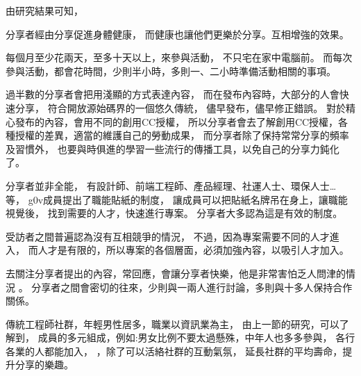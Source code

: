 
由研究結果可知，


分享者經由分享促進身體健康，
而健康也讓他們更樂於分享。互相增強的效果。

每個月至少花兩天，至多十天以上，來參與活動，
不只宅在家中電腦前。
而每次參與活動，都會花時間，少則半小時，多則一、二小時準備活動相關的事項。

過半數的分享者會把用淺顯的方式表達內容，
而在發布內容時，大部分的人會快速分享，
符合開放源始碼界的一個悠久傳統，
儘早發布，儘早修正錯誤。
對於精心發布的內容，會用不同的創用CC授權，
所以分享者會去了解創用CC授權，各種授權的差異，適當的維護自己的勞動成果，
而分享者除了保持常常分享的頻率及習慣外，
也要與時俱進的學習一些流行的傳播工具，以免自己的分享力鈍化了。

分享者並非全能，
有設計師、前端工程師、產品經理、社運人士、環保人士…等，
g0v成員提出了職能貼紙的制度，
讓成員可以把貼紙名牌吊在身上，讓職能視覺後，
找到需要的人才，快速進行專案。
分享者大多認為這是有效的制度。

受訪者之間普遍認為沒有互相競爭的情況，
不過，因為專案需要不同的人才進入，
而人才是有限的，所以專案的各個層面，必須加強內容，以吸引人才加入。

去關注分享者提出的內容，常回應，會讓分享者快樂，他是非常害怕乏人問津的情況 。
分享者之間會密切的往來，少則與一兩人進行討論，多則與十多人保持合作關係。


傳統工程師社群，年輕男性居多，職業以資訊業為主，
由上一節的研究，可以了解到，
成員的多元組成，例如:男女比例不要太過懸殊，中年人也多多參與，
各行各業的人都能加入，
，除了可以活絡社群的互動氣氛，
延長社群的平均壽命，提升分享的樂趣。




\EndChapter
